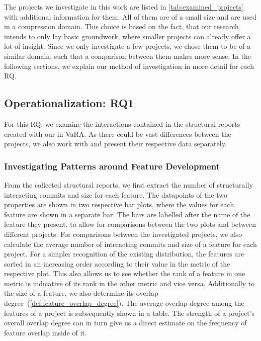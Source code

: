 The projects we investigate in this work are listed in \autoref{tab:examined_projects} with additional information for them.
All of them are of a small size and are used in a compression domain.
This choice is based on the fact, that our research intends to only lay basic groundwork, where smaller projects can already offer a lot of insight.
Since we only investigate a few projects, we chose them to be of a similar domain, such that a comparison between them makes more sense.
In the following sections, we explain our method of investigation in more detail for each RQ.

\subsection[RQ1]{Operationalization: RQ1}\label{sec:op:RQ1}

For this RQ, we examine the interactions contained in the structural reports created with our  in VaRA.
As there could be vast differences between the projects, we also work with and present their respective data separately.

\subsubsection*{Investigating Patterns around Feature Development}

From the collected structural reports, we first extract the number of structurally interacting commits and size for each feature.
The datapoints of the two properties are shown in two respective bar plots, where the values for each feature are shown in a separate bar.
The bars are labelled after the name of the feature they present, to allow for comparisons between the two plots and between different projects.
For comparisons between the investigated projects, we also calculate the average number of interacting commits and size of a feature for each project.
For a simpler recognition of the existing distribution, the features are sorted in an increasing order according to their value in the metric of the respective plot.
This also allows us to see whether the rank of a feature in one metric is indicative of its rank in the other metric and vice versa.
Additionally to the size of a feature, we also determine its overlap degree~(\autoref{def:feature_overlap_degree}).
The average overlap degree among the features of a project is subsequently shown in a table.
The strength of a project's overall overlap degree can in turn give us a direct estimate on the frequency of feature overlap inside of it.

